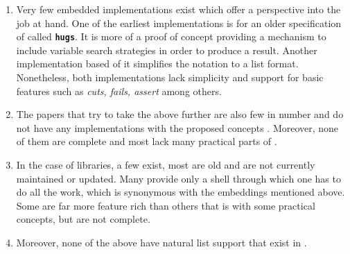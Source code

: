 \documentclass[thesis-solanki.tex]{subfiles}
\begin{document}
\begin{enumerate}
\item
  Very few embedded implementations exist which offer a perspective into the job at hand.
  One of the earliest implementations \cite{website:mini-prolog-hugs98} is for an older specification of
   called  \texttt{\bfseries{hugs}}.
  It is more of a proof of concept providing a mechanism to include variable search strategies in order to produce
  a result.
  Another implementation \cite{website:takashi-workplace} based of it simplifies the notation to a list format.
  Nonetheless, both implementations lack simplicity and support for basic  features such as
  \textit{cuts, fails, assert} among others.

\begin{comment}
\item
  Only two embeddings exist, one of them is old and made for \texttt{\bfseries{hugs}} a functional programming
  system based on the \progLang{Haskell 98} specification.
  It is complex and also lacks a lot of \progLang{Prolog} like features including \textit{cuts, fails, assert}
  among others.
  The second one is based off the first one to make it simple but it loses the variable search strategy support
  which allows the programmer to choose the manner in which a solution is produced.
\end{comment}

\item
  The papers that try to take the above further are also few in number and do not have any implementations with the
  proposed concepts \cite{spivey1999embedding, seres1999algebra, seres2001algebra, spivey2000functional, seres2000optimisation}.
  Moreover, none of them are complete and most lack many practical parts of .

\item
  In the case of libraries, a few exist, most are old and are not currently maintained or updated.
  Many provide only a shell through which one has to do all the work, which is synonymous with the embeddings
  mentioned above.
  Some are far more feature rich than others that is with some practical  concepts, but are not
  complete.

\item
  Moreover, none of the above have natural list support that exist in .
\end{enumerate}
\end{document}
